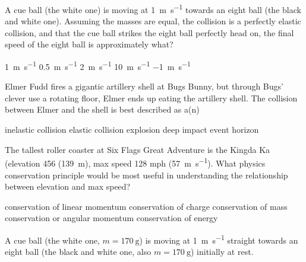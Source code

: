\documentclass[exam,addpoints, noanswers]{exam}
\begin{document}
\begin{questions}
\question[5] A cue ball (the white one) is moving at \SI{1}{\meter\per\second} towards an eight ball (the black and white one). Assuming the masses are equal, the collision is a perfectly elastic collision, and that the cue ball strikes the eight ball perfectly head on, the final speed of the eight ball is approximately what?
\begin{choices}
\CorrectChoice \SI{1}{\meter\per\second}
\choice \SI{0.5}{\meter\per\second}
\choice \SI{2}{\meter\per\second}
\choice \SI{10}{\meter\per\second}
\choice \SI{-1}{\meter\per\second}
\end{choices}

\question[5] Elmer Fudd fires a gigantic artillery shell at Bugs Bunny, but through Bugs' clever use a rotating floor, Elmer ends up eating the artillery shell. The collision between Elmer and the shell is best described as a(n)
\begin{choices}
\CorrectChoice inelastic collision
\choice elastic collision
\choice explosion
\choice deep impact
\choice event horizon
\end{choices}

\question[5] The tallest roller coaster at Six Flags Great Adventure is the Kingda Ka (elevation \SI{456}{\foot} (\SI{139}{\meter}), max speed 128 mph (\SI{57}{\meter\per\second}). What physics conservation principle would be most useful in understanding the relationship between elevation and max speed?
\begin{choices}
\choice conservation of linear momentum
\choice conservation of charge
\choice conservation of mass
\choice conservation or angular momentum
\CorrectChoice conservation of energy
\end{choices}





\clearpage
\question  A cue ball (the white one, $m=\SI{170}{\gram}$) is moving at \SI{1}{\meter\per\second} straight towards an eight ball (the black and white one, also $m=\SI{170}{\gram}$) initially at rest.
\end{questions}
\end{document}
